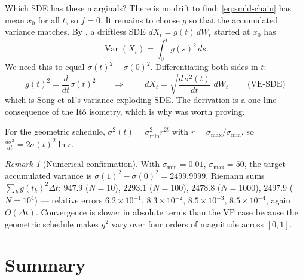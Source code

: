 \documentclass[11pt,a4paper]{report}
\theoremstyle{definition}
\theoremstyle{remark}
\newtheorem{remark}[remark]{Remark}
\DeclareMathOperator{\Var}{Var}
\begin{document}
Which SDE has these marginals? There is no drift to find: \eqref{eq:smld-chain}
has mean $x_0$ for all $t$, so $f=0$. It remains to choose $g$ so that the
accumulated variance matches. By , a driftless SDE
$dX_t=g(t)\,dW_t$ started at $x_0$ has
\begin{equation}
\Var(X_t) = \int_0^t g(s)^2\,ds .
\end{equation}
We need this to equal $\sigma(t)^2-\sigma(0)^2$. Differentiating both sides
in $t$:
\begin{equation}
g(t)^2 = \frac{d}{dt}\sigma(t)^2
\qquad\Longrightarrow\qquad
\boxed{\;dX_t = \sqrt{\frac{d\,\sigma^2(t)}{dt}}\;dW_t\;}
\qquad\text{(VE-SDE)}
\end{equation}
which is Song et al.'s variance-exploding SDE. The derivation is a
one-line consequence of the It\^o isometry, which is why
 was worth proving.

For the geometric schedule, $\sigma^2(t)=\sigma_{\min}^2r^{2t}$ with
$r=\sigma_{\max}/\sigma_{\min}$, so
$\frac{d\sigma^2}{dt}=2\sigma(t)^2\ln r$.

\begin{remark}[Numerical confirmation]
\label{rem:ve-limit-numbers}
With $\sigma_{\min}=0.01$, $\sigma_{\max}=50$, the target accumulated
variance is $\sigma(1)^2-\sigma(0)^2=2499.9999$. Riemann sums
$\sum_kg(t_k)^2\Delta t$:
$947.9$ ($N=10$), $2293.1$ ($N=100$), $2478.8$ ($N=1000$),
$2497.9$ ($N=10^4$) --- relative errors $6.2\times10^{-1}$,
$8.3\times10^{-2}$, $8.5\times10^{-3}$, $8.5\times10^{-4}$, again $O(\Delta
t)$. Convergence is slower in absolute terms than the VP case because the
geometric schedule makes $g^2$ vary over four orders of magnitude across
$[0,1]$.
\end{remark}

\section{Summary}
\label{sec:sde-summary}
\end{document}
